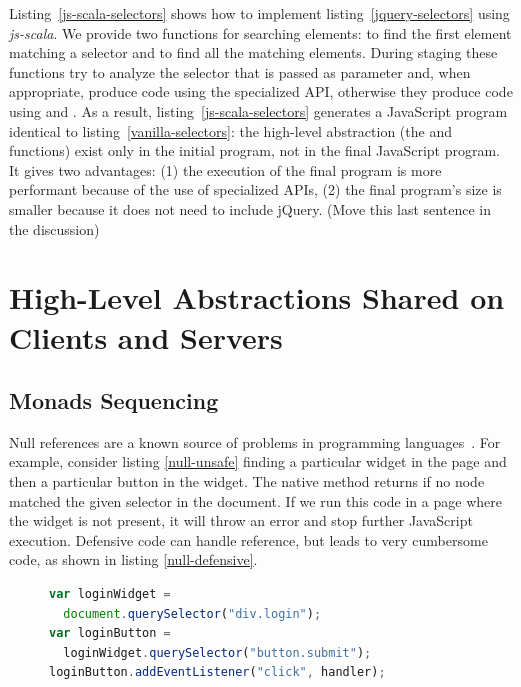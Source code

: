 \documentclass[preprint]{sigplanconf}
\begin{document}
Listing~\ref{js-scala-selectors} shows how to implement listing~\ref{jquery-selectors} using \emph{js-scala}. We
provide two functions for searching elements:  to find the first element matching a selector and
 to find all the matching elements. During staging these functions try to analyze the selector that is
passed as parameter and, when appropriate, produce code using the specialized API, otherwise they produce code using
 and . As a result, listing~\ref{js-scala-selectors} generates a
JavaScript program identical to listing~\ref{vanilla-selectors}: the high-level abstraction (the  and
 functions) exist only in the initial program, not in the final JavaScript program. It gives two
advantages: (1) the execution of the final program is more performant because of the use of specialized APIs, (2) the
final program’s size is smaller because it does not need to include jQuery. (Move this last sentence in the
discussion)


\section{High-Level Abstractions Shared on Clients and Servers}
\label{contribution-shared}

\subsection{Monads Sequencing}

Null references are a known source of problems in programming languages~\cite{Hoare09_Null,Nanda09_Null}. For
example, consider listing \ref{null-unsafe} finding a particular widget in the page and then a particular
button in the widget. The native  method returns  if no node matched the given
selector in the document. If we run this code in a page where the widget is not present, it will throw an error
and stop further JavaScript execution. Defensive code can handle  reference, but leads to very cumbersome
code, as shown in listing \ref{null-defensive}.

\begin{figure}
\begin{lstlisting}[language=JavaScript,label=null-unsafe,caption=Unsafe code]
var loginWidget =
  document.querySelector("div.login");
var loginButton =
  loginWidget.querySelector("button.submit");
loginButton.addEventListener("click", handler);
\end{lstlisting}
\end{figure}
\end{document}
